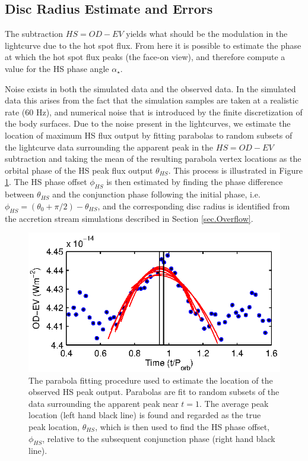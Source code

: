 \documentclass[preprint2]{aastex}
\begin{document}
\subsection{Disc Radius Estimate and Errors}

The subtraction $HS=OD-EV$ yields what should be the modulation in the
lightcurve due to the hot spot flux.  From here it is possible to
estimate the phase at which the hot spot flux peaks (the face-on view),
and therefore compute a value for the HS phase angle $\alpha_\star$.

Noise exists in both the simulated data and the observed data. In the simulated data this arises from the fact that the simulation samples are taken at a realistic rate (60 Hz), and numerical noise that is introduced by the finite discretization of the body surfaces. Due to the noise present in the lightcurves, we estimate the location of maximum HS flux output by fitting parabolas to random subsets of the lightcurve data surrounding the apparent peak in the $HS = OD - EV$ subtraction and taking the mean of the resulting parabola vertex locations as the orbital phase of the HS peak flux output $\theta_{HS}$. This process is illustrated in Figure \ref{fig.parabolas}. The HS phase offset $\phi_{HS}$ is then estimated by finding the phase difference between $\theta_{HS}$ and the conjunction phase following the initial phase, i.e. $\phi_{HS} = (\theta_0 + \pi/2) - \theta_{HS}$, and the corresponding disc radius is identified from the accretion stream simulations described in Section \ref{sec.Overflow}.

\begin{figure}[t]
\centering
\includegraphics[width=\columnwidth]{./figs/AMCVn_parabolas.eps}
\caption{The parabola fitting procedure used to estimate the location of the observed HS peak output. Parabolas are fit to random subsets of the data surrounding the apparent peak near $ t=1 $. The average peak location (left hand black line) is found and regarded as the true peak location, $ \theta_{HS} $, which is then used to find the HS phase offset, $ \phi_{HS} $, relative to the subsequent conjunction phase (right hand black line).}
\label{fig.parabolas}
\end{figure}
\end{document}
